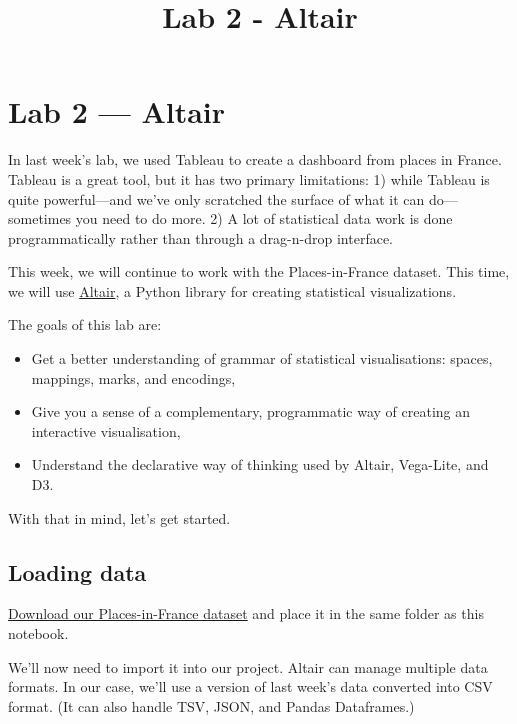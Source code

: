 \documentclass[11pt]{article}
\title{Lab 2 - Altair}
\providecommand{\tightlist}{%
      \setlength{\itemsep}{0pt}\setlength{\parskip}{0pt}}
\begin{document}
    
    
    \maketitle
    
    

    
    \section{Lab 2 --- Altair}\label{lab-2-altair}

In last week's lab, we used Tableau to create a dashboard from places in
France. Tableau is a great tool, but it has two primary limitations: 1)
while Tableau is quite powerful---and we've only scratched the surface
of what it can do---sometimes you need to do more. 2) A lot of
statistical data work is done programmatically rather than through a
drag-n-drop interface.

This week, we will continue to work with the Places-in-France dataset.
This time, we will use \href{https://altair-viz.github.io}{Altair}, a
Python library for creating statistical visualizations.

The goals of this lab are:

\begin{itemize}
\tightlist
\item
  Get a better understanding of grammar of statistical visualisations:
  spaces, mappings, marks, and encodings,
\item
  Give you a sense of a complementary, programmatic way of creating an
  interactive visualisation,
\item
  Understand the declarative way of thinking used by Altair, Vega-Lite,
  and D3.
\end{itemize}

With that in mind, let's get started.

\subsection{Loading data}\label{loading-data}

\href{https://perso.telecom-paristech.fr/eagan/class/igr204/data/france.csv}{Download
our Places-in-France dataset} and place it in the same folder as this
notebook.

We'll now need to import it into our project. Altair can manage multiple
data formats. In our case, we'll use a version of last week's data
converted into CSV format. (It can also handle TSV, JSON, and Pandas
Dataframes.)
\end{document}

